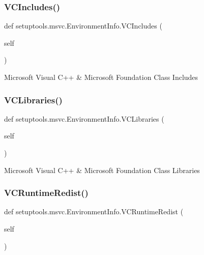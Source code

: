 \subsubsection{\texorpdfstring{V\+C\+Includes()}{VCIncludes()}}
{\footnotesize\ttfamily def setuptools.\+msvc.\+Environment\+Info.\+V\+C\+Includes (\begin{DoxyParamCaption}\item[{}]{self }\end{DoxyParamCaption})}

\begin{DoxyVerb}Microsoft Visual C++ & Microsoft Foundation Class Includes
\end{DoxyVerb}
 \mbox{\label{classsetuptools_1_1msvc_1_1_environment_info_a801f70fc7fcfdee61534e8ffa5153eb2}} 
\subsubsection{\texorpdfstring{V\+C\+Libraries()}{VCLibraries()}}
{\footnotesize\ttfamily def setuptools.\+msvc.\+Environment\+Info.\+V\+C\+Libraries (\begin{DoxyParamCaption}\item[{}]{self }\end{DoxyParamCaption})}

\begin{DoxyVerb}Microsoft Visual C++ & Microsoft Foundation Class Libraries
\end{DoxyVerb}
 \mbox{\label{classsetuptools_1_1msvc_1_1_environment_info_a2ad0b92bc587a134b6eddb0b970df495}} 
\subsubsection{\texorpdfstring{V\+C\+Runtime\+Redist()}{VCRuntimeRedist()}}
{\footnotesize\ttfamily def setuptools.\+msvc.\+Environment\+Info.\+V\+C\+Runtime\+Redist (\begin{DoxyParamCaption}\item[{}]{self }\end{DoxyParamCaption})}

